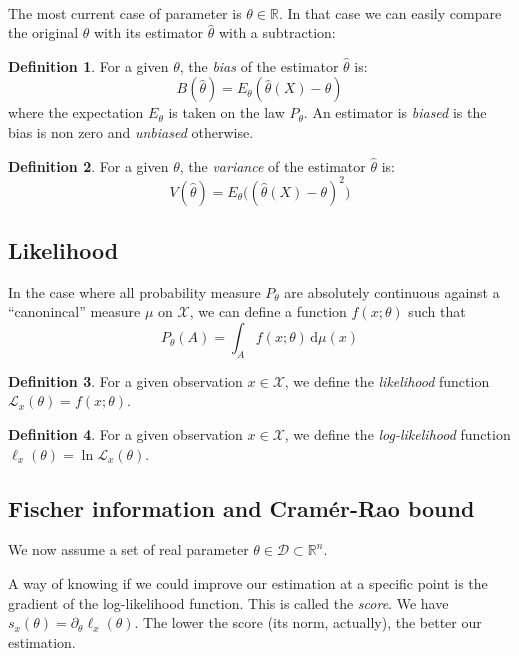 \documentclass[10pt]{report}
\theoremstyle{plain}
\theoremstyle{definition}
\newtheorem{defn}{Definition}[chapter]
\theoremstyle{remark}
\newcommand{\R}{\ensuremath{\mathbb{R}}}
\newcommand{\dd}{\mathrm{d}}
\begin{document}
\

The most current case of parameter is $\theta \in \R$. In that case we can
easily compare the original $\theta$ with its estimator $\hat \theta$ with a
subtraction:

\begin{defn}
  For a given $\theta$, the \emph{bias} of the estimator $\hat \theta$ is:
  \[B(\hat{\theta}) = E_\theta(\hat{\theta}(X) - \theta)\]
  where the expectation $E_\theta$ is taken on the law $P_\theta$. An estimator
  is \emph{biased} is the bias is non zero and \emph{unbiased} otherwise.
\end{defn}

\begin{defn}
  For a given $\theta$, the \emph{variance} of the estimator $\hat \theta$ is:
  \[V(\hat{\theta}) = E_\theta\Big({(\hat{\theta}(X) - \theta)}^2\Big)\]
\end{defn}

\subsection{Likelihood}

In the case where all probability measure $P_\theta$ are absolutely
continuous against a ``canonincal'' measure $\mu$ on $\mathcal{X}$, we can
define a function $f(x;\theta)$ such that
\[P_\theta(A) = \int_A f(x;\theta)\,\dd \mu(x)\]

\begin{defn}
  For a given observation $x \in \mathcal{X}$, we define the \emph{likelihood} function
  $\mathcal{L}_x(\theta) = f(x;\theta)$.
\end{defn}

\begin{defn}
  For a given observation $x \in \mathcal{X}$, we define the \emph{log-likelihood} function
  $\ell_x(\theta) = \ln \mathcal{L}_x(\theta)$.
\end{defn}

\subsection{Fischer information and Cramér-Rao bound}

We now assume a set of real parameter $\theta \in \mathcal{D} \subset \R^n$.

A way of knowing if we could improve our estimation at a specific point is the
gradient of the log-likelihood function. This is called the
\emph{score}. We have $s_x(\theta) = \partial_\theta \ell_x(\theta)$. The
lower the score (its norm, actually), the better our estimation.
\end{document}
